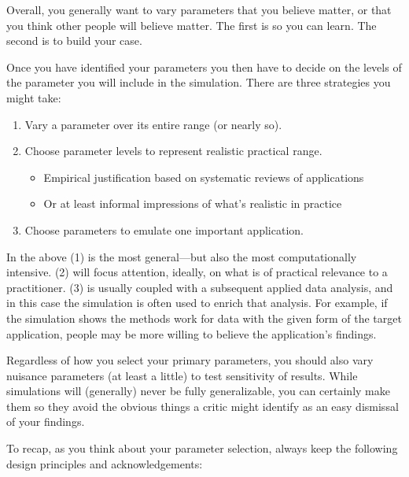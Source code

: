 \documentclass[
]{book}
\providecommand{\tightlist}{%
  \setlength{\itemsep}{0pt}\setlength{\parskip}{0pt}}
\begin{document}
Overall, you generally want to vary parameters that you believe matter, or that you think other people will believe matter.
The first is so you can learn.
The second is to build your case.

Once you have identified your parameters you then have to decide on the levels of the parameter you will include in the simulation.
There are three strategies you might take:

\begin{enumerate}
\def\labelenumi{\arabic{enumi}.}
\tightlist
\item
  Vary a parameter over its entire range (or nearly so).
\item
  Choose parameter levels to represent realistic practical range.

  \begin{itemize}
  \tightlist
  \item
    Empirical justification based on systematic reviews of applications
  \item
    Or at least informal impressions of what's realistic in practice
  \end{itemize}
\item
  Choose parameters to emulate one important application.
\end{enumerate}

In the above (1) is the most general---but also the most computationally intensive.
(2) will focus attention, ideally, on what is of practical relevance to a practitioner.
(3) is usually coupled with a subsequent applied data analysis, and in this case the simulation is often used to enrich that analysis.
For example, if the simulation shows the methods work for data with the given form of the target application, people may be more willing to believe the application's findings.

Regardless of how you select your primary parameters, you should also vary nuisance parameters (at least a little) to test sensitivity of results.
While simulations will (generally) never be fully generalizable, you can certainly make them so they avoid the obvious things a critic might identify as an easy dismissal of your findings.

To recap, as you think about your parameter selection, always keep the following design principles and acknowledgements:
\end{document}
